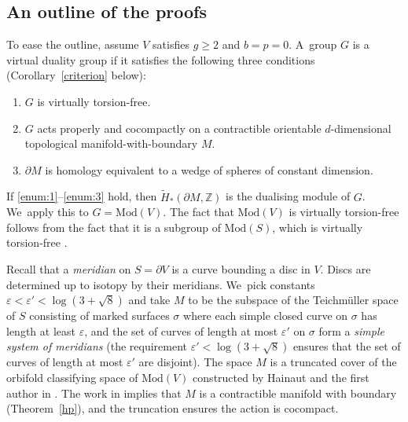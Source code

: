 \documentclass[11pt]{article}
\theoremstyle{plain}
\theoremstyle{definition}
\let\eps\varepsilon
\newcommand{\Z}{\mathbb Z}
\newcommand{\mcg}{\mathrm{Mod}}
\newcommand{\hmod}{\mathrm{Mod}}
\begin{document}
\subsection{An outline of the proofs}

To ease the outline, assume $V$ satisfies $g\geq 2$ and $b=p=0$. A~group $G$ is a virtual duality group if it satisfies the following three conditions (Corollary~\ref{criterion} below):\enlargethispage{.5\baselineskip}
\begin{enumerate}
\item\label{enum:1} $G$ is virtually torsion-free.
\item\label{enum:2} $G$ acts properly and cocompactly on a contractible
orientable $d$-dimensional topological manifold-with-boundary $M$.
\item\label{enum:3} $\partial M$ is homology equivalent to a wedge of spheres of constant dimension.
\end{enumerate}
If \eqref{enum:1}--\eqref{enum:3} hold, then $\widetilde H_\ast(\partial M,\Z)$ is the dualising module of $G$. We~apply this to $G=\hmod(V)$. The fact that $\hmod(V)$ is virtually torsion-free follows from the fact that it is a subgroup of $\mcg(S)$, which is virtually torsion-free \cite[Th.\,6.9]{farbmargalit}.

Recall that a \emph{meridian} on $S=\partial V$ is a curve bounding a disc in $V$. Discs are determined up to isotopy by their meridians. We~pick constants $\eps < \eps ' < \log(3+\sqrt{8})$ and take $M$ to be the subspace of the Teichmüller space of $S$ consisting of marked surfaces $\sigma$ where each simple closed curve on $\sigma$ has length at least $\eps$, and the set of curves of length at most $\eps'$ on $\sigma$ form a \emph{simple system of meridians} (the requirement $\eps ' < \log(3+\sqrt{8})$ ensures that the set of curves of length at most $\eps'$ are disjoint). The space $M$ is a truncated cover of the orbifold classifying space of $\hmod(V)$ constructed by Hainaut and the first author in \cite{hainautpetersen}. The work in \cite{hainautpetersen} implies that $M$ is a contractible manifold with boundary (Theorem~\ref{hp}), and the truncation ensures the action is cocompact.
\end{document}

